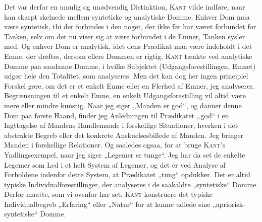 \documentclass[12pt]{article}
\begin{document}
Det var derfor en umulig og unødvendig Distinktion, \textsc{Kant} vilde
indføre, naar han skarpt skelnede mellem syntetiske og analytiske Domme.
Enhver Dom maa være syntetisk, thi der forbindes i den noget, der ikke før har
været forbundet for Tanken, selv om det nu viser sig at være forbundet i de
Emner, Tanken sysler med. Og enhver Dom er analytisk, idet dens Prædikat maa
være indeholdt i det Emne, der drøftes, dersom ellers Dommen er rigtig.
\textsc{Kant} tænkte ved analytiske Domme paa saadanne Domme, i hvilke
Subjektet (Udgangsforestillingen, Emnet) udgør hele den Totalitet, som
analyseres. Men det kan dog her ingen principiel Forskel gøre, om det er et
enkelt Emne eller en Flerhed af Emner, jeg analyserer. Begrænsningen til et
enkelt Emne, en enkelt Udgangsforestilling vil altid være mere eller mindre
kunstig. Naar jeg siger „Manden er god“, og danner denne Dom paa første
Haand, finder jeg Anledningen til Prædikatet „god“ i en Iagttagelse af Mandens
Handlemaade i forskellige Situationer, hverken i det abstrakte Begreb eller
det konkrete Anskuelsesbillede af Manden. Jeg bringer Manden i forskellige
Relationer. Og saaledes ogsaa, for at bruge \textsc{Kant}'s Yndlingsexempel,
naar jeg siger „Legemer er tunge“. Jeg har da set de enkelte Legemer som Led i
et helt System af Legemer, og det er ved Analyse af Forholdene indenfor dette
System, at Prædikatet „tung“ opdukker. Det er altid typiske
Individualforestillinger, der analyseres i de saakaldte „syntetiske“ Domme.
Derfor maatte, som vi ovenfor har set, \textsc{Kant} konstruere det typiske
Individualbegreb „Erfaring“ eller „Natur“ for at kunne udlede sine
„apriorisk-syntetiske“ Domme.
\end{document}
